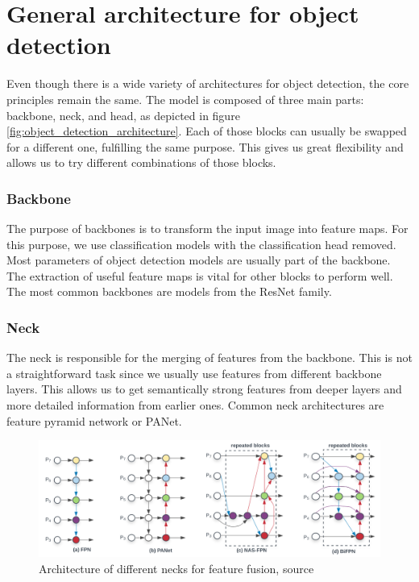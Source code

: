 \section{General architecture for object detection}
Even though there is a wide variety of architectures for object detection, the core principles remain the same. The model is composed of three main parts: backbone, neck, and head, as depicted in figure \ref{fig:object_detection_architecture}. Each of those blocks can usually be swapped for a different one, fulfilling the same purpose. This gives us great flexibility and allows us to try different combinations of those blocks.



\subsubsection{Backbone}
The purpose of backbones is to transform the input image into feature maps. For this purpose, we use classification models with the classification head removed. Most parameters of object detection models are usually part of the backbone. The extraction of useful feature maps is vital for other blocks to perform well. The most common backbones are models from the ResNet family.

\subsubsection{Neck}
The neck is responsible for the merging of features from the backbone. This is not a straightforward task since we usually use features from different backbone layers. This allows us to get semantically strong features from deeper layers and more detailed information from earlier ones. Common neck architectures are feature pyramid network or PANet.
\begin{figure}
    \centering
    \includegraphics[width=\linewidth]{images/necks_architecture.png}
    \caption{Architecture of different necks for feature fusion, source \cite{Tan2019}}
    \label{fig:necks}
\end{figure}

